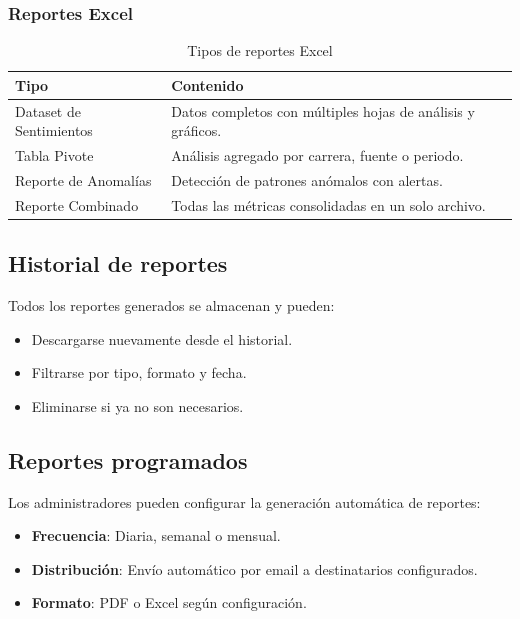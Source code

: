 \documentclass[12pt,a4paper]{article}
\begin{document}
\subsubsection{Reportes Excel}
\begin{table}[H]
\centering
\begin{tabularx}{\textwidth}{l X}
\toprule
\textbf{Tipo} & \textbf{Contenido} \\
\midrule
Dataset de Sentimientos & Datos completos con múltiples hojas de análisis y gráficos. \\
Tabla Pivote & Análisis agregado por carrera, fuente o periodo. \\
Reporte de Anomalías & Detección de patrones anómalos con alertas. \\
Reporte Combinado & Todas las métricas consolidadas en un solo archivo. \\
\bottomrule
\end{tabularx}
\caption{Tipos de reportes Excel}
\end{table}

\subsection{Historial de reportes}
Todos los reportes generados se almacenan y pueden:
\begin{itemize}
  \item Descargarse nuevamente desde el historial.
  \item Filtrarse por tipo, formato y fecha.
  \item Eliminarse si ya no son necesarios.
\end{itemize}

\subsection{Reportes programados}
Los administradores pueden configurar la generación automática de reportes:
\begin{itemize}
  \item \textbf{Frecuencia}: Diaria, semanal o mensual.
  \item \textbf{Distribución}: Envío automático por email a destinatarios configurados.
  \item \textbf{Formato}: PDF o Excel según configuración.
\end{itemize}

\newpage
\end{document}
